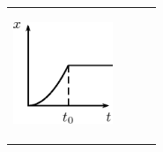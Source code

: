 \begin{enumerate}[noitemsep, label=\textbf{\arabic*}. ]
    
    \setlength\mytableroom{\mytablewidth}
    \addtolength\mytableroom{-\mytablespace}
    
    \setlength\myfixedwidth{0pt}
    \setlength\mystarwidth{\mytableroom}
        \addtolength\mystarwidth{-\myfixedwidth}
        \divide{}
        
    
            
    
        \begin{center}
      
      \label{m38796*id81647}
      
    \noindent
      \tablelasttail{}
      \begin{xtabular*}{\mytablewidth}[t]{|p{10\mystarwidth}|p{10\mystarwidth}|p{10\mystarwidth}|p{10\mystarwidth}|}\hline
    
    
        
    \setcounter{subfigure}{0}

\label{m38796*id81654}
    \begin{center}
    \label{m38796*id81654!!!underscore!!!media}\label{m38796*id81654!!!underscore!!!printimage}\includegraphics[width=3cm]{col11305.imgs/m38796_PG10C2_047.png} %
        
      \vspace{2pt}
    \vspace{.1in}
    
    \end{center}



    \addtocounter{footnote}{-0}
     &
    

\end{xtabular*}
\end{center}
\end{enumerate}

